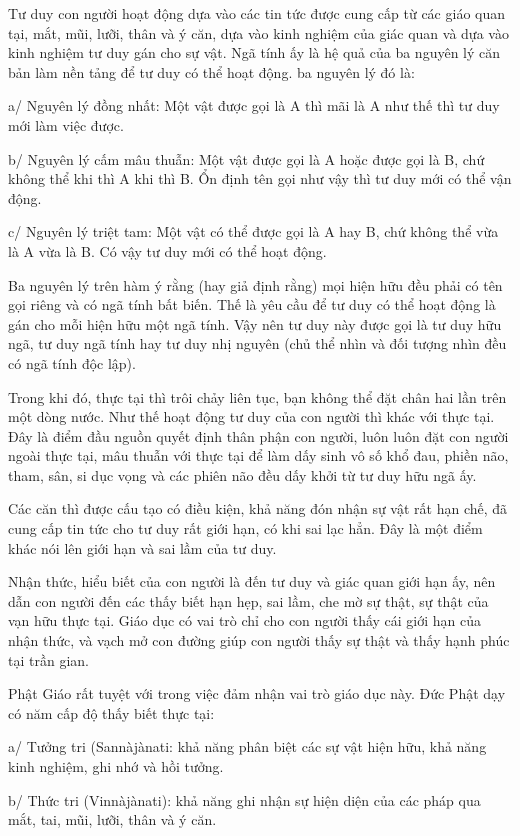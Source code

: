 Tư duy con người hoạt động dựa vào các tin tức được cung cấp từ các giáo quan tại, mắt, mũi, lưỡi, thân và ý căn, dựa vào kinh nghiệm của giác quan và dựa vào kinh nghiệm tư duy gán cho sự vật. Ngã tính ấy là hệ quả của ba nguyên lý căn bản làm nền tảng để tư duy có thể hoạt động. ba nguyên lý đó là:

a/ Nguyên lý đồng nhất: Một vật được gọi là A thì mãi là A như thế thì tư duy mới làm việc được.

b/ Nguyên lý cấm mâu thuẫn: Một vật được gọi là A hoặc được gọi là B, chứ không thể khi thì A khi thì B. Ổn định tên gọi như vậy thì tư duy mới có thể vận động.

c/ Nguyên lý triệt tam: Một vật có thể được gọi là A hay B, chứ không thể vừa là A vừa là B. Có vậy tư duy mới có thể hoạt động.

Ba nguyên lý trên hàm ý rằng (hay giả định rằng) mọi hiện hữu đều phải có tên gọi riêng và có ngã tính bất biến. Thế là yêu cầu để tư duy có thể hoạt động là gán cho mỗi hiện hữu một ngã tính. Vậy nên tư duy này được gọi là tư duy hữu ngã, tư duy ngã tính hay tư duy nhị nguyên (chủ thể nhìn và đối tượng nhìn đều có ngã tính độc lập).

Trong khi đó, thực tại thì trôi chảy liên tục, bạn không thể đặt chân hai lần trên một dòng nước. Như thế hoạt động tư duy của con người thì khác với thực tại. Đây là điểm đầu nguồn quyết định thân phận con người, luôn luôn đặt con người ngoài thực tại, mâu thuẫn với thực tại để làm dấy sinh vô số khổ đau, phiền não, tham, sân, si dục vọng và các phiên não đều dấy khởi từ tư duy hữu ngã ấy.

Các căn thì được cấu tạo có điều kiện, khả năng đón nhận sự vật rất hạn chế, đã cung cấp tin tức cho tư duy rất giới hạn, có khi sai lạc hẳn. Đây là một điểm khác nói lên giới hạn và sai lầm của tư duy.

Nhận thức, hiểu biết của con người là đến tư duy và giác quan giới hạn ấy, nên dẫn con người đến các thấy biết hạn hẹp, sai lầm, che mờ sự thật, sự thật của vạn hữu thực tại. Giáo dục có vai trò chỉ cho con người thấy cái giới hạn của nhận thức, và vạch mở con đường giúp con người thấy sự thật và thấy hạnh phúc tại trần gian.

Phật Giáo rất tuyệt với trong việc đảm nhận vai trò giáo dục này. Đức Phật dạy có năm cấp độ thấy biết thực tại:

a/ Tưởng tri (Sannàjànati: khả năng phân biệt các sự vật hiện hữu, khả năng kinh nghiệm, ghi nhớ và hồi tưởng.

b/ Thức tri (Vinnàjànati): khả năng ghi nhận sự hiện diện của các pháp qua mắt, tai, mũi, lưỡi, thân và ý căn.

